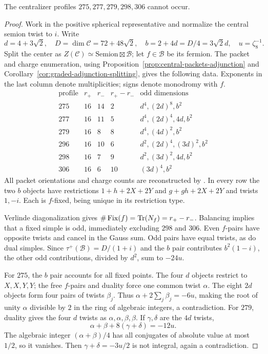 \begin{proposition}
\label{prop:155-centralizer-cuts}
The centralizer profiles $275,277,279,298,306$ cannot occur.
\end{proposition}
\begin{proof}
Work in the positive spherical representative and normalize the central
semion twist to $i$. Write
\[
 d=4+3\sqrt2,\quad D=\dim\mathcal C=72+48\sqrt2,\quad
 b=2+4d=D/4=3\sqrt2d,\quad u=\zeta_8^{-1}.
\]
Split the center as $Z(\mathcal C)\simeq\mathrm{Semion}\boxtimes\mathcal B$;
let $f\in\mathcal B$ be its fermion. The packet and charge enumeration,
using Proposition~\ref{prop:central-packets-adjunction} and
Corollary~\ref{cor:graded-adjunction-splitting}, gives the following data.
Exponents in the last column denote multiplicities; signs denote
monodromy with $f$.
\[
\begin{array}{c|rrr|l}
 \text{profile}&r_+&r_-&r_+-r_-&\text{odd dimensions}\\\hline
 275&16&14&2 &d^4,(2d)^8,b^2\\
 277&16&11&5 &d^4,(2d)^4,4d,b^2\\
 279&16&8 &8 &d^4,(4d)^2,b^2\\
 296&16&10&6 &d^2,(2d)^4,(3d)^2,b^2\\
 298&16&7 &9 &d^2,(3d)^2,4d,b^2\\
 306&16&6 &10&(3d)^4,b^2
\end{array}
\]
All packet orientations and charge counts are reconstructed by
. In every row the two $b$ objects
have restrictions $1+h+2X+2Y$ and $g+gh+2X+2Y$ and twists $1,-i$.
Each is $f$-fixed, being unique in its restriction type.

Verlinde diagonalization gives
$\#\operatorname{Fix}(f)=\operatorname{Tr}(N_f)=r_+-r_-$. Balancing implies that a
fixed simple is odd, immediately excluding $298$ and $306$.
Even $f$-pairs have opposite twists and cancel in the Gauss sum.
Odd pairs have equal twists, as do dual simples. Since
$\tau^+(\mathcal B)=D/(1+i)$ and the $b$ pair contributes $b^2(1-i)$,
the other odd contributions, divided by $d^2$, sum to $-24u$.

For $275$, the $b$ pair accounts for all fixed points. The four
$d$ objects restrict to $X,X,Y,Y$; the free $f$-pairs and duality force
one common twist $\alpha$. The eight $2d$ objects form four pairs of
twists $\beta_j$. Thus
$\alpha+2\sum_j\beta_j=-6u$, making the root of unity $\alpha$ divisible
by $2$ in the ring of algebraic integers, a contradiction.
For $279$, duality gives the four $d$ twists as
$\alpha,\alpha,\beta,\beta$. If $\gamma,\delta$ are the $4d$ twists,
\[
 \alpha+\beta+8(\gamma+\delta)=-12u.
\]
The algebraic integer $(\alpha+\beta)/4$ has all conjugates of absolute
value at most $1/2$, so it vanishes. Then
$\gamma+\delta=-3u/2$ is not integral, again a contradiction.


\end{proof}
